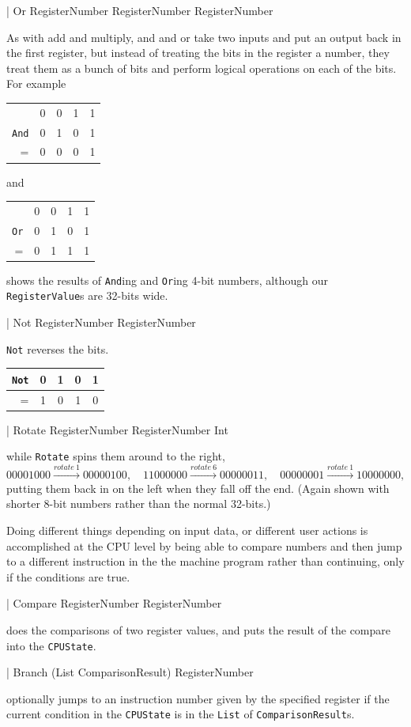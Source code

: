 \documentclass[12pt]{amsbook}
\begin{document}
{\begin{code}
                  | Or             RegisterNumber RegisterNumber RegisterNumber
\end{code}
As with add and multiply, and and or take two inputs and put an output back in the first register,
but instead of treating the bits in the register a number, they treat them as a bunch of bits and perform logical operations on each of the bits.  For example
\begin{center}
\begin{tabular}{rcccc}
   & 0 & 0 & 1 & 1 \\
\texttt{And} & 0 & 1 & 0 & 1 \\ \hline
= & 0 & 0 & 0 & 1
\end{tabular} 
\quad and \quad
\begin{tabular}{rcccc}
   & 0 & 0 & 1 & 1 \\
\texttt{Or} & 0 & 1 & 0 & 1 \\ \hline
 = & 0 & 1 & 1 & 1
\end{tabular}
\end{center}
shows the results of \texttt{And}ing and \texttt{Or}ing 4-bit numbers, although our \texttt{RegisterValue}s are 32-bits wide.
\begin{code}
                  | Not            RegisterNumber RegisterNumber
\end{code}
\texttt{Not} reverses the bits.
\begin{center}
\begin{tabular}{rcccc}
\texttt{Not} & 0 & 1 & 0 & 1 \\ \hline
 = & 1 & 0 & 1 & 0
\end{tabular}
\end{center}
\begin{code}
                  | Rotate         RegisterNumber RegisterNumber Int           
\end{code}
while \texttt{Rotate} spins them around to the right, 
$$
00001000 \overset{rotate\ 1}{\longrightarrow} 00000100, \quad 
11000000 \overset{rotate\ 6}{\longrightarrow} 00000011,\quad 
00000001 \overset{rotate\ 1}{\longrightarrow} 10000000,
$$
putting them back in on the left when they fall off the end.  (Again shown with shorter 8-bit numbers rather than the normal 32-bits.)

Doing different things depending on input data, or different user actions is accomplished
at the CPU level by being able to compare numbers and then jump to a different instruction in the the machine program rather than continuing, only if the conditions are true. 
\begin{code}
                  | Compare        RegisterNumber RegisterNumber
\end{code}
does the comparisons of two register values, and puts the result of the compare into the \texttt{CPUState}.
\begin{code}
                  | Branch         (List ComparisonResult) RegisterNumber
\end{code}
optionally jumps to an instruction number given by the specified register if the current condition in the \texttt{CPUState} is in the \texttt{List} of \texttt{ComparisonResult}s.

}
\end{document}
